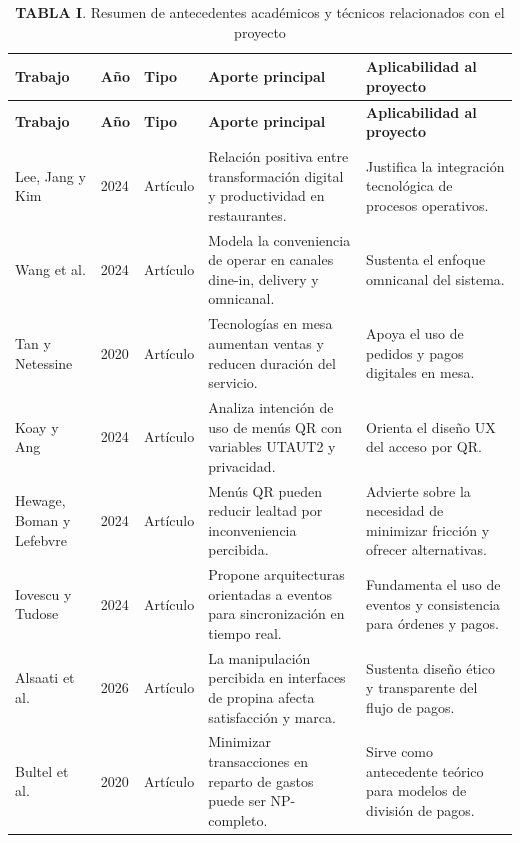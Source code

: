\documentclass[12pt]{report}
\begin{document}
\begin{table}[H]
\centering
\setlength{\aboverulesep}{0pt}
\setlength{\belowrulesep}{0pt}
\begin{tabularx}{\textwidth}{p{3cm}p{1cm}p{2cm}XX}
\toprule
\textbf{Trabajo} & \textbf{Año} & \textbf{Tipo} & \textbf{Aporte principal} & \textbf{Aplicabilidad al proyecto} \\
\midrule
\hline
\textbf{Trabajo} & \textbf{Año} & \textbf{Tipo} & \textbf{Aporte principal} & \textbf{Aplicabilidad al proyecto} \\ \hline
Lee, Jang y Kim & 2024 & Artículo & Relación positiva entre transformación digital y productividad en restaurantes. & Justifica la integración tecnológica de procesos operativos. \\
Wang et al. & 2024 & Artículo & Modela la conveniencia de operar en canales dine-in, delivery y omnicanal. & Sustenta el enfoque omnicanal del sistema. \\
Tan y Netessine & 2020 & Artículo & Tecnologías en mesa aumentan ventas y reducen duración del servicio. & Apoya el uso de pedidos y pagos digitales en mesa. \\
Koay y Ang & 2024 & Artículo & Analiza intención de uso de menús QR con variables UTAUT2 y privacidad. & Orienta el diseño UX del acceso por QR. \\
Hewage, Boman y Lefebvre & 2024 & Artículo & Menús QR pueden reducir lealtad por inconveniencia percibida. & Advierte sobre la necesidad de minimizar fricción y ofrecer alternativas. \\
Iovescu y Tudose & 2024 & Artículo & Propone arquitecturas orientadas a eventos para sincronización en tiempo real. & Fundamenta el uso de eventos y consistencia para órdenes y pagos. \\
Alsaati et al. & 2026 & Artículo & La manipulación percibida en interfaces de propina afecta satisfacción y marca. & Sustenta diseño ético y transparente del flujo de pagos. \\
Bultel et al. & 2020 & Artículo & Minimizar transacciones en reparto de gastos puede ser NP-completo. & Sirve como antecedente teórico para modelos de división de pagos. \\
\bottomrule
\end{tabularx}
\caption*{\normalfont\textbf{TABLA I}. Resumen de antecedentes académicos y técnicos relacionados con el proyecto}
\label{tab:antecedentes_academicos}
\end{table}

\end{document}
